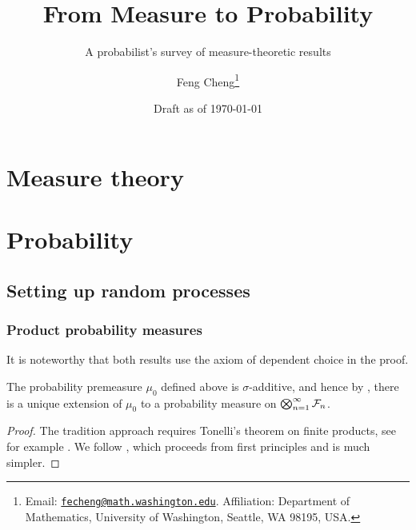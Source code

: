 \documentclass[10pt]{book}
\title{From Measure to Probability}
\subtitle{A probabilist's survey of measure-theoretic results}
\author{Feng Cheng\thanks{Email: \href{mailto:fecheng@uw.edu}{\texttt{fecheng@math.washington.edu}}. Affiliation: Department of Mathematics, University of Washington, Seattle, WA 98195, USA.}}
\date{Draft as of \today}
\begin{document}
\maketitle

\cleardoublepage
{}
\tableofcontents




\part{Measure theory}





% 



\part{Probability}






\chapter{Setting up random processes}
\section{Product probability measures} \label{sec:product-prob-meas}
It is noteworthy that both results use the axiom of dependent choice in the proof.
\begin{namedthm} \label{thm:prod-prob-meas-countable-spaces}
    The probability premeasure $\mu_0$ defined above is $\sigma$-additive, and hence by , there is a unique extension of $\mu_0$ to a probability measure on $\bigotimes_{n=1}^\infty \mathcal{F}_n$.
\end{namedthm}
\begin{proof}
    The tradition approach requires Tonelli's theorem on finite products, see for example \cite[Section 6.3]{Ambrosio_2011}. We follow \cite{Saeki_1996}, which proceeds from first principles and is much simpler.
\end{proof}
\end{document}
